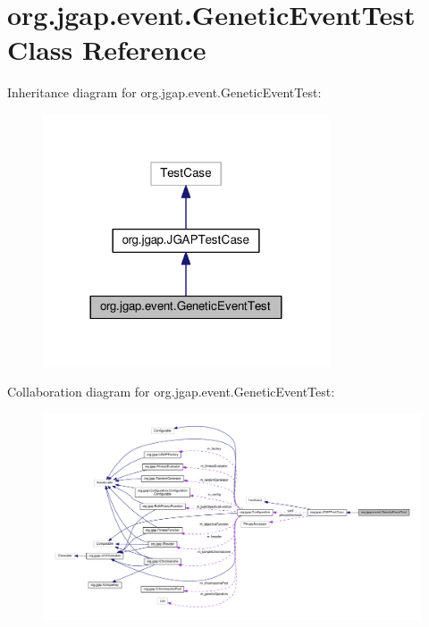 \hypertarget{classorg_1_1jgap_1_1event_1_1_genetic_event_test}{\section{org.\-jgap.\-event.\-Genetic\-Event\-Test Class Reference}
\label{classorg_1_1jgap_1_1event_1_1_genetic_event_test}
}


Inheritance diagram for org.\-jgap.\-event.\-Genetic\-Event\-Test\-:
\nopagebreak
\begin{figure}[H]
\begin{center}
\leavevmode
\includegraphics[width=240pt]{classorg_1_1jgap_1_1event_1_1_genetic_event_test__inherit__graph}
\end{center}
\end{figure}


Collaboration diagram for org.\-jgap.\-event.\-Genetic\-Event\-Test\-:
\nopagebreak
\begin{figure}[H]
\begin{center}
\leavevmode
\includegraphics[width=350pt]{classorg_1_1jgap_1_1event_1_1_genetic_event_test__coll__graph}
\end{center}
\end{figure}
